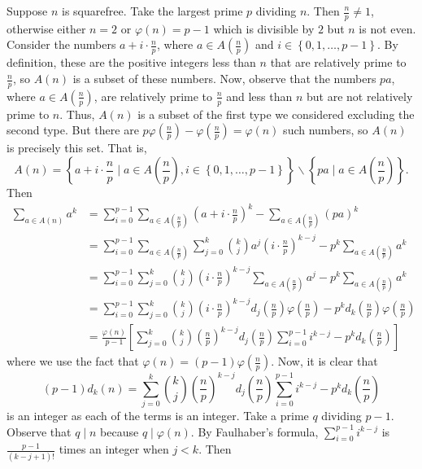 Suppose $n$ is squarefree. Take the largest prime $p$ dividing $n$. Then $\frac{n}{p}\neq1$, otherwise either $n=2$ or $\varphi\left(n\right)=p-1$ which is divisible by $2$ but $n$ is not even. Consider the numbers $a+i\cdot\frac{n}{p}$, where $a\in A\left(\frac{n}{p}\right)$ and $i\in\left\{0,1,\ldots,p-1\right\}$. By definition, these are the positive integers less than $n$ that are relatively prime to $\frac{n}{p}$, so $A\left(n\right)$ is a subset of these numbers. Now, observe that the numbers $pa$, where $a\in A\left(\frac{n}{p}\right)$, are relatively prime to $\frac{n}{p}$ and less than $n$ but are not relatively prime to $n$. Thus, $A\left(n\right)$ is a subset of the first type we considered excluding the second type. But there are $p\varphi\left(\frac{n}{p}\right)-\varphi\left(\frac{n}{p}\right)=\varphi\left(n\right)$ such numbers, so $A\left(n\right)$ is precisely this set. That is, \[A\left(n\right)=\left\{a+i\cdot\frac{n}{p}\mid a\in A\left(\frac{n}{p}\right),i\in\left\{0,1,\ldots,p-1\right\}\right\}\backslash\left\{pa\mid a\in A\left(\frac{n}{p}\right)\right\}.\] Then
\begin{align*}
	\displaystyle\sum_{a\in A\left(n\right)}a^k&=\displaystyle\sum_{i=0}^{p-1}\displaystyle\sum_{a\in A\left(\frac{n}{p}\right)}\left(a+i\cdot\frac{n}{p}\right)^k-\displaystyle\sum_{a\in A\left(\frac{n}{p}\right)}\left(pa\right)^k\\
	&=\displaystyle\sum_{i=0}^{p-1}\displaystyle\sum_{a\in A\left(\frac{n}{p}\right)}\displaystyle\sum_{j=0}^k\binom{k}{j}a^j\left(i\cdot\frac{n}{p}\right)^{k-j}-p^k\displaystyle\sum_{a\in A\left(\frac{n}{p}\right)}a^k\\
	&=\displaystyle\sum_{i=0}^{p-1}\displaystyle\sum_{j=0}^k\binom{k}{j}\left(i\cdot\frac{n}{p}\right)^{k-j}\displaystyle\sum_{a\in A\left(\frac{n}{p}\right)}a^j-p^k\displaystyle\sum_{a\in A\left(\frac{n}{p}\right)}a^k\\
	&=\displaystyle\sum_{i=0}^{p-1}\displaystyle\sum_{j=0}^k\binom{k}{j}\left(i\cdot\frac{n}{p}\right)^{k-j}d_j\left(\frac{n}{p}\right)\varphi\left(\frac{n}{p}\right)-p^kd_k\left(\frac{n}{p}\right)\varphi\left(\frac{n}{p}\right)\\
	&=\frac{\varphi\left(n\right)}{p-1}\left[\displaystyle\sum_{j=0}^k\binom{k}{j}\left(\frac{n}{p}\right)^{k-j}d_j\left(\frac{n}{p}\right)\displaystyle\sum_{i=0}^{p-1}i^{k-j}-p^kd_k\left(\frac{n}{p}\right)\right]
\end{align*}
where we use the fact that $\varphi\left(n\right)=\left(p-1\right)\varphi\left(\frac{n}{p}\right)$. Now, it is clear that \[\left(p-1\right)d_k\left(n\right)=\displaystyle\sum_{j=0}^k\binom{k}{j}\left(\frac{n}{p}\right)^{k-j}d_j\left(\frac{n}{p}\right)\displaystyle\sum_{i=0}^{p-1}i^{k-j}-p^kd_k\left(\frac{n}{p}\right)\] is an integer as each of the terms is an integer. Take a prime $q$ dividing $p-1$. Observe that $q\mid n$ because $q\mid\varphi\left(n\right)$. By Faulhaber's formula, $\displaystyle\sum_{i=0}^{p-1}i^{k-j}$ is $\frac{p-1}{\left(k-j+1\right)!}$ times an integer when $j<k$. Then
